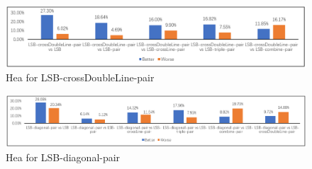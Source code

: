 \begin{figure}[h]
\includegraphics[width=\columnwidth]{image/LSB-crossDoubleLine-pair.PNG}
\caption{Hea for LSB-crossDoubleLine-pair}
\label{fig:figure}
\end{figure} 

\begin{figure}[h]
\includegraphics[width=\columnwidth]{image/LSB-diagonal-pair.PNG}
\caption{Hea for LSB-diagonal-pair}
\label{fig:figure}
\end{figure} 
